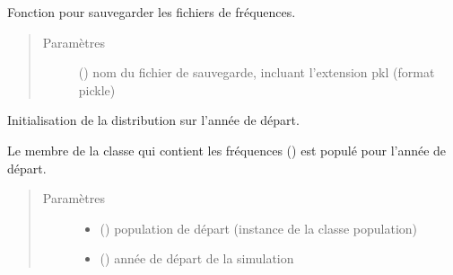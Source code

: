 \documentclass[letterpaper,10pt,french]{sphinxmanual}
\begin{document}
\begin{fulllineitems}
\begin{fulllineitems}
\begin{quote}
\begin{description}
\end{description}\end{quote}

\end{fulllineitems}


\begin{fulllineitems}
\label{\detokenize{code:simgen.statistics.save}}
Fonction pour sauvegarder les fichiers de fréquences.
\begin{quote}\begin{description}
\item[{Paramètres}] \leavevmode
{} () \textendash{} nom du fichier de sauvegarde, incluant l’extension pkl (format pickle)

\end{description}\end{quote}

\end{fulllineitems}


\begin{fulllineitems}
\label{\detokenize{code:simgen.statistics.start}}
Initialisation de la distribution sur l’année de départ.

Le membre de la classe qui contient les fréquences () est populé pour l’année de départ.
\begin{quote}\begin{description}
\item[{Paramètres}] \leavevmode\begin{itemize}
\item {} 
 ({\hyperref[\detokenize{code:simgen.population}]{}}) \textendash{} population de départ (instance de la classe population)

\item {} 
 () \textendash{} année de départ de la simulation

\end{itemize}

\end{description}\end{quote}

\end{fulllineitems}


\end{fulllineitems}
\end{document}

